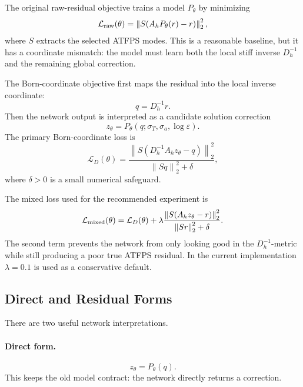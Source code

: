 \documentclass[11pt]{article}
\newcommand{\norm}[1]{\left\lVert #1 \right\rVert}
\begin{document}
The original raw-residual objective trains a model \(P_\theta\) by minimizing
\begin{equation}
  \mathcal{L}_{\rm raw}(\theta)
  =
  \norm{
    S(A_h P_\theta(r)-r)
  }_2^2,
  \label{eq:raw-loss}
\end{equation}
where \(S\) extracts the selected ATFPS modes.  This is a reasonable baseline,
but it has a coordinate mismatch: the model must learn both the local stiff
inverse \(D_h^{-1}\) and the remaining global correction.

The Born-coordinate objective first maps the residual into the local inverse
coordinate:
\begin{equation}
  q = D_h^{-1}r.
\end{equation}
Then the network output is interpreted as a candidate solution correction
\begin{equation}
  z_\theta = P_\theta(q;\sigma_T,\sigma_a,\log\varepsilon).
\end{equation}
The primary Born-coordinate loss is
\begin{equation}
  \mathcal{L}_{D}(\theta)
  =
  \frac{
    \norm{
      S\left(D_h^{-1}A_h z_\theta - q\right)
    }_2^2
  }{
    \norm{S q}_2^2 + \delta
  },
  \label{eq:born-loss}
\end{equation}
where \(\delta>0\) is a small numerical safeguard.

The mixed loss used for the recommended experiment is
\begin{equation}
  \mathcal{L}_{\rm mixed}(\theta)
  =
  \mathcal{L}_{D}(\theta)
  +
  \lambda
  \frac{
    \norm{S(A_h z_\theta-r)}_2^2
  }{
    \norm{S r}_2^2 + \delta
  }.
  \label{eq:mixed-loss}
\end{equation}
The second term prevents the network from only looking good in the
\(D_h^{-1}\)-metric while still producing a poor true ATFPS residual.  In the
current implementation \(\lambda=0.1\) is used as a conservative default.

\subsection{Direct and Residual Forms}

There are two useful network interpretations.

\paragraph{Direct form.}
\begin{equation}
  z_\theta = P_\theta(q).
\end{equation}
This keeps the old model contract: the network directly returns a correction.
\end{document}
